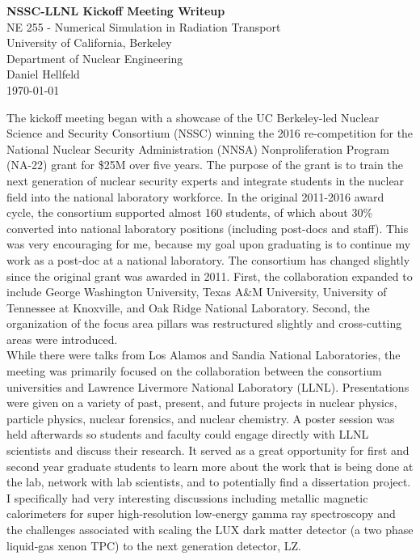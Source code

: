 \documentclass[11pt]{article}
\begin{document}
\begin{centering}
\textbf{NSSC-LLNL Kickoff Meeting Writeup }\\
\vspace{11pt}
NE 255 - Numerical Simulation in Radiation Transport\\
University of California, Berkeley\\
Department of Nuclear Engineering\\
\vspace{11pt}
Daniel Hellfeld\\
\vspace{11pt}
\today \\
\end{centering}

\vspace{22pt}


The kickoff meeting began with a showcase of the UC Berkeley-led Nuclear Science and Security Consortium (NSSC) winning the 2016 re-competition for the National Nuclear Security Administration (NNSA) Nonproliferation Program (NA-22) grant for \$25M over five years. The purpose of the grant is to train the next generation of nuclear security experts and integrate students in the nuclear field into the national laboratory workforce. In the original 2011-2016 award cycle, the consortium supported almost 160 students, of which about 30\% converted into national laboratory positions (including post-docs and staff). This was very encouraging for me, because my goal upon graduating is to continue my work as a post-doc at a national laboratory. The consortium has changed slightly since the original grant was awarded in 2011. First, the collaboration expanded to include George Washington University, Texas A\&M University, University of Tennessee at Knoxville, and Oak Ridge National Laboratory. Second, the organization of the focus area pillars was restructured slightly and cross-cutting areas were introduced. \\


While there were talks from Los Alamos and Sandia National Laboratories, the meeting was primarily focused on the collaboration between the consortium universities and Lawrence Livermore National Laboratory (LLNL). Presentations were given on a variety of past, present, and future projects in nuclear physics, particle physics, nuclear forensics, and nuclear chemistry. A poster session was held afterwards so students and faculty could engage directly with LLNL scientists and discuss their research. It served as a great opportunity for first and second year graduate students to learn more about the work that is being done at the lab, network with lab scientists, and to potentially find a dissertation project. I specifically had very interesting discussions including metallic magnetic calorimeters for super high-resolution low-energy gamma ray spectroscopy and the challenges associated with scaling the LUX dark matter detector (a two phase liquid-gas xenon TPC) to the next generation detector, LZ.\\
\end{document}
